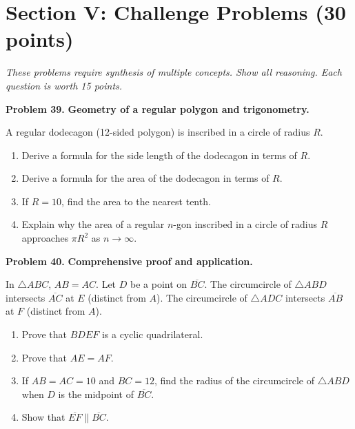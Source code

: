 \documentclass[12pt,addpoints]{exam}
\begin{document}
\newpage

\section*{Section V: Challenge Problems \hfill (30 points)}
\noindent\textit{These problems require synthesis of multiple concepts. Show all reasoning. Each question is worth 15 points.}

\bigskip

\noindent\textbf{Problem 39.} \textbf{Geometry of a regular polygon and trigonometry.}

A regular dodecagon (12-sided polygon) is inscribed in a circle of radius $R$.

\begin{enumerate}[label=(\alph*),leftmargin=1.5cm]
  \item Derive a formula for the side length of the dodecagon in terms of $R$.
  \item Derive a formula for the area of the dodecagon in terms of $R$.
  \item If $R = 10$, find the area to the nearest tenth.
  \item Explain why the area of a regular $n$-gon inscribed in a circle of radius $R$ approaches $\pi R^2$ as $n \to \infty$.
\end{enumerate}

\vspace{3cm}

\noindent\textbf{Problem 40.} \textbf{Comprehensive proof and application.}

In $\triangle ABC$, $AB = AC$. Let $D$ be a point on $\overline{BC}$. The circumcircle of $\triangle ABD$ intersects $\overline{AC}$ at $E$ (distinct from $A$). The circumcircle of $\triangle ADC$ intersects $\overline{AB}$ at $F$ (distinct from $A$).

\begin{enumerate}[label=(\alph*),leftmargin=1.5cm]
  \item Prove that $BDEF$ is a cyclic quadrilateral.
  \item Prove that $AE = AF$.
  \item If $AB = AC = 10$ and $BC = 12$, find the radius of the circumcircle of $\triangle ABD$ when $D$ is the midpoint of $\overline{BC}$.
  \item Show that $\overline{EF} \parallel \overline{BC}$.
\end{enumerate}
\end{document}
